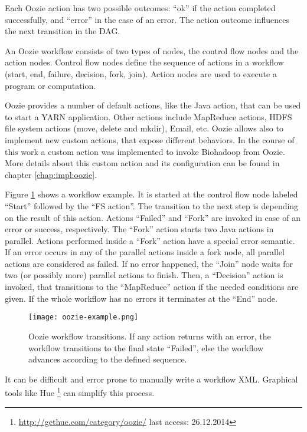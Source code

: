 Each Oozie action has two possible outcomes: ``ok'' if the action completed successfully, and ``error'' in the case of an error. The action outcome influences the next transition in the DAG. 

An Oozie workflow consists of two types of nodes, the control flow nodes and the action nodes. Control flow nodes define the sequence of actions in a workflow (start, end, failure, decision, fork, join). Action nodes are used to execute a program or computation.

Oozie provides a number of default actions, like the Java action, that can be used to start a YARN application. Other actions include MapReduce actions, HDFS file system actions (move, delete and mkdir), Email, etc. Oozie allows also to implement new custom actions, that expose different behaviors. In the course of this work a custom action was implemented to invoke Biohadoop from Oozie. More details about this custom action and its configuration can be found in chapter \ref{chap:impl:oozie}.

Figure \ref{fig:oozie-example} shows a workflow example. It is started at the control flow node labeled ``Start'' followed by  the ``FS action''. The transition to the next step is depending on the result of this action. Actions ``Failed'' and ``Fork'' are invoked in case of an error or success, respectively. The ``Fork'' action starts two Java actions in parallel. Actions performed inside a ``Fork'' action have a special error semantic. If an error occurs in any of the parallel actions inside a fork node, all parallel actions are considered as failed. If no error happened, the ``Join'' node waits for two (or possibly more) parallel actions to finish. Then, a ``Decision'' action is invoked, that transitions to the ``MapReduce'' action if the needed conditions are given. If the whole workflow has no errors it terminates at the ``End'' node.

\begin{figure}
  \centering
  \texttt{[image: oozie-example.png]}
  \caption[Oozie workflow transitions]{Oozie workflow transitions. If any action returns with an error, the workflow transitions to the final state ``Failed'', else the workflow advances according to the defined sequence.}
  \label{fig:oozie-example}
\end{figure}

It can be difficult and error prone to manually write a workflow XML. Graphical tools like Hue \footnote{\url{http://gethue.com/category/oozie/} last access: 26.12.2014} can simplify this process.